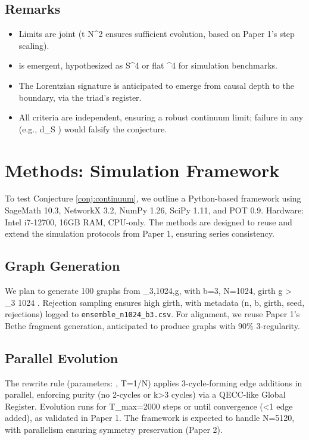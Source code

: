 \documentclass[11pt, a4paper]{article}
\begin{document}
\subsection{Remarks}
\begin{itemize}
  \item Limits are joint (t \propto N^2 ensures sufficient evolution, based on Paper 1's step scaling).
  \item {} is emergent, hypothesized as S^4 or flat ^4 for simulation benchmarks.
  \item The Lorentzian signature is anticipated to emerge from causal depth to the boundary, via the triad's register.
  \item All criteria are independent, ensuring a robust continuum limit; failure in any (e.g., d_S ) would falsify the conjecture.
\end{itemize}

\section{Methods: Simulation Framework}

To test Conjecture \ref{conj:continuum}, we outline a Python-based framework using SageMath 10.3, NetworkX 3.2, NumPy 1.26, SciPy 1.11, and POT 0.9. Hardware: Intel i7-12700, 16GB RAM, CPU-only. The methods are designed to reuse and extend the simulation protocols from Paper 1, ensuring series consistency.

\subsection{Graph Generation}
We plan to generate 100 graphs from _{3,1024,g}, with b=3, N=1024, girth g > \lceil \log_3 1024 \rceil {}. Rejection sampling ensures high girth, with metadata (n, b, girth, seed, rejections) logged to \texttt{ensemble_n1024_b3.csv}. For alignment, we reuse Paper 1's Bethe fragment generation, anticipated to produce graphs with 90\% 3-regularity.

\subsection{Parallel Evolution}
The rewrite rule  (parameters: , T=1/\ln N) applies 3-cycle-forming edge additions in parallel, enforcing purity (no 2-cycles or k>3 cycles) via a QECC-like Global Register. Evolution runs for T_max=2000 steps or until convergence (<1 edge added), as validated in Paper 1. The framework is expected to handle N=5120, with parallelism ensuring symmetry preservation (Paper 2).
\end{document}
